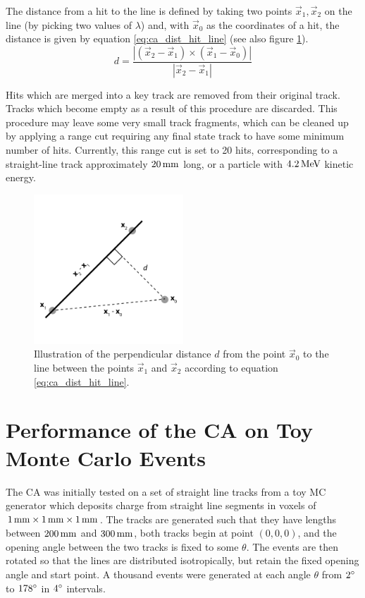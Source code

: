 The distance from a hit to the line is defined by taking two points $\vec{x}_1, \vec{x}_2$ on the line (by picking two values of $\lambda$) and, with $\vec{x}_0$ as the coordinates of a hit, the distance is given by equation \ref{eq:ca_dist_hit_line} (see also figure \ref{fig:ca_perp_dist}).
\begin{equation}\label{eq:ca_dist_hit_line}
d = \frac{|(\vec{x}_2 - \vec{x}_1) \times (\vec{x}_1 - \vec{x}_0)|}{|\vec{x}_2 - \vec{x}_1|}
\end{equation}

Hits which are merged into a key track are removed from their original track. Tracks which become empty as a result of this procedure are discarded. This procedure may leave some very small track fragments, which can be cleaned up by applying a range cut requiring any final state track to have some minimum number of hits. Currently, this range cut is set to 20 hits, corresponding to a straight-line track approximately $20\,\mathrm{mm}$ long, or a particle with $4.2\,\mathrm{MeV}$ kinetic energy.

\begin{figure}
\centering
\includegraphics[width=0.5\textwidth]{chapters/cellularautomaton_images/PerpDist}
\caption[Perpendicular distance from a point to a line in 3D]{\label{fig:ca_perp_dist}Illustration of the perpendicular distance $d$ from the point $\vec{x}_0$ to the line between the points $\vec{x}_1$ and $\vec{x}_2$ according to equation \ref{eq:ca_dist_hit_line}.}
\end{figure}

\section{Performance of the \acl{CA} on Toy Monte Carlo Events}
The \ac{CA} was initially tested on a set of straight line tracks from a toy \ac{MC} generator which deposits charge from straight line segments in voxels of $1\,\mathrm{mm}\times1\,\mathrm{mm}\times1\,\mathrm{mm}$. The tracks are generated such that they have lengths between $200\,\mathrm{mm}$ and $300\,\mathrm{mm}$, both tracks begin at point $(0, 0, 0)$, and the opening angle between the two tracks is fixed to some $\theta$. The events are then rotated so that the lines are distributed isotropically, but retain the fixed opening angle and start point. A thousand events were generated at each angle $\theta$ from $2^\circ$ to $178^\circ$ in $4^\circ$ intervals.

